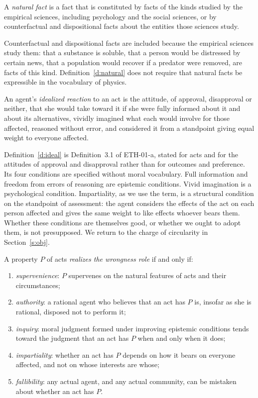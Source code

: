 \documentclass{situationist-preprint}
\begin{document}
\begin{definition}\label{d:natural}
A \emph{natural fact} is a fact that is constituted by facts of the kinds studied by the empirical sciences, including psychology and the social sciences, or by counterfactual and dispositional facts about the entities those sciences study.
\end{definition}

Counterfactual and dispositional facts are included because the empirical sciences study them: that a substance is soluble, that a person would be distressed by certain news, that a population would recover if a predator were removed, are facts of this kind. Definition~\ref{d:natural} does not require that natural facts be expressible in the vocabulary of physics.

\begin{definition}\label{d:ideal}
An agent's \emph{idealized reaction} to an act is the attitude, of approval, disapproval or neither, that she would take toward it if she were fully informed about it and about its alternatives, vividly imagined what each would involve for those affected, reasoned without error, and considered it from a standpoint giving equal weight to everyone affected.
\end{definition}

Definition~\ref{d:ideal} is Definition~3.1 of ETH-01-a, stated for acts and for the attitudes of approval and disapproval rather than for outcomes and preference. Its four conditions are specified without moral vocabulary. Full information and freedom from errors of reasoning are epistemic conditions. Vivid imagination is a psychological condition. Impartiality, as we use the term, is a structural condition on the standpoint of assessment: the agent considers the effects of the act on each person affected and gives the same weight to like effects whoever bears them. Whether these conditions are themselves good, or whether we ought to adopt them, is not presupposed. We return to the charge of circularity in Section~\ref{s:obj}.

\begin{definition}\label{d:role}
A property $P$ of acts \emph{realizes the wrongness role} if and only if:
\begin{enumerate}[label=(\alph*)]
\item \emph{supervenience}: $P$ supervenes on the natural features of acts and their circumstances;
\item \emph{authority}: a rational agent who believes that an act has $P$ is, insofar as she is rational, disposed not to perform it;
\item \emph{inquiry}: moral judgment formed under improving epistemic conditions tends toward the judgment that an act has $P$ when and only when it does;
\item \emph{impartiality}: whether an act has $P$ depends on how it bears on everyone affected, and not on whose interests are whose;
\item \emph{fallibility}: any actual agent, and any actual community, can be mistaken about whether an act has $P$.
\end{enumerate}
\end{definition}
\end{document}

